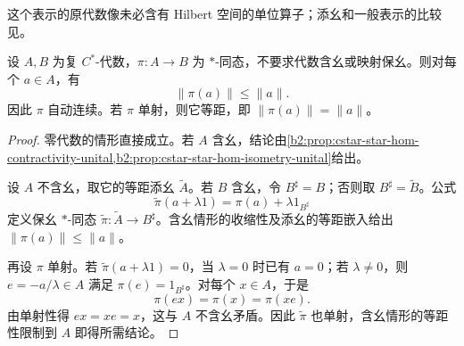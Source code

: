 这个表示的原代数像未必含有 Hilbert 空间的单位算子；添幺和一般表示的比较见\cite[\nopp II.1.2; Corollary II.6.4.10]{Blackadar2017OperatorAlgebrasCorrected}。

\begin{proposition}[一般 \(C^*\)-代数的 \(*\)-同态]\label{b2:prop:cstar-star-hom-general}
	设 \(A,B\) 为复 \(C^*\)-代数，\(\pi:A\to B\) 为 \(*\)-同态，不要求代数含幺或映射保幺。则对每个 \(a\in A\)，有
	\[
		\|\pi(a)\|\le\|a\|.
	\]
	因此 \(\pi\) 自动连续。若 \(\pi\) 单射，则它等距，即 \(\|\pi(a)\|=\|a\|\)。
\end{proposition}
\begin{proof}
	零代数的情形直接成立。若 \(A\) 含幺，结论由\cref{b2:prop:cstar-star-hom-contractivity-unital,b2:prop:cstar-star-hom-isometry-unital}给出。

	设 \(A\) 不含幺，取它的等距添幺 \(\widetilde A\)。若 \(B\) 含幺，令 \(B^\sharp=B\)；否则取 \(B^\sharp=\widetilde B\)。公式
	\[
		\widetilde\pi(a+\lambda1)=\pi(a)+\lambda1_{B^\sharp}
	\]
	定义保幺 \(*\)-同态 \(\widetilde\pi:\widetilde A\to B^\sharp\)。含幺情形的收缩性及添幺的等距嵌入给出 \(\|\pi(a)\|\le\|a\|\)。

	再设 \(\pi\) 单射。若 \(\widetilde\pi(a+\lambda1)=0\)，当 \(\lambda=0\) 时已有 \(a=0\)；若 \(\lambda\ne0\)，则 \(e=-a/\lambda\in A\) 满足 \(\pi(e)=1_{B^\sharp}\)。对每个 \(x\in A\)，于是
	\[
		\pi(ex)=\pi(x)=\pi(xe).
	\]
	由单射性得 \(ex=xe=x\)，这与 \(A\) 不含幺矛盾。因此 \(\widetilde\pi\) 也单射，含幺情形的等距性限制到 \(A\) 即得所需结论。
\end{proof}

